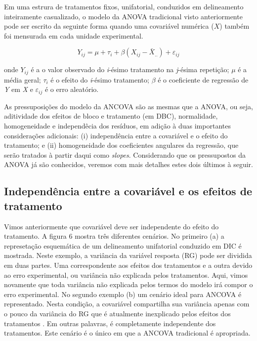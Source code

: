 \documentclass[
]{book}
\numberwithin{equation}{section}
\newcommand{\indt}[1]{\index{#1|ST}}
\begin{document}
Em uma estrura de tratamentos fixos, unifatorial, conduzidos em delineamento inteiramente casualizado, o modelo da ANOVA\indt{ANOVA} tradicional visto anteriormente pode ser escrito da seguinte forma quando uma covariável numérica (\(X\)) também foi mensurada em cada unidade experimental.

\[
Y_{ij} = \mu + \tau_i + \beta(X_{ij} - \bar X_{..}) + \varepsilon_{ij}
\]

onde \(Y_{ij}\) é a o valor observado do \emph{i}-ésimo tratamento na \emph{j}-ésima repetição; \(\mu\) é a média geral; \(\tau_i\) é o efeito do \emph{i}-ésimo tratamento; \(\beta\) é o coeficiente de regressão de \emph{Y} em \emph{X} e \(\varepsilon_{ij}\) é o erro aleatório.

As pressuposições do modelo da ANCOVA\indt{ANCOVA} são as mesmas que a ANOVA, ou seja, aditividade dos efeitos de bloco e tratamento (em DBC), normalidade, homogeneidade e independêcia dos resíduos, em adição à duas importantes considerações adicionais: (i) independência entre a covariável e o efeito do tratamento; e (ii) homogeneidade dos coeficientes angulares da regressão, que serão tratados à partir daqui como \emph{slopes}. Considerando que os pressupostos da ANOVA\indt{ANOVA} já são conhecidos, veremos com mais detalhes estes dois últimos à seguir.

\hypertarget{independuxeancia-entre-a-covariuxe1vel-e-os-efeitos-de-tratamento}{%
\subsection{Independência entre a covariável e os efeitos de tratamento}\label{independuxeancia-entre-a-covariuxe1vel-e-os-efeitos-de-tratamento}}

Vimos anteriormente que covariável deve ser independente do efeito do tratamento. A figura 6 mostra três diferentes cenários. No primeiro (a) a represetação esquemática de um delineamento unifatorial conduzido em DIC é mostrada. Neste exemplo, a variância da variável resposta (RG) pode ser dividida em duas partes. Uma correspondente aos efeitos dos tratamentos e a outra devido ao erro experimental, ou variância não explicada pelos tratamentos. Aqui, vimos novamente que toda variância não explicada pelos termos do modelo irá compor o erro experimental. No segundo exemplo (b) um cenário ideal para ANCOVA\indt{ANCOVA} é representado. Nesta condição, a covariável compartilha sua variância apenas com o pouco da variância do RG que é atualmente inexplicado pelos efeitos dos tratamentos . Em outras palavras, é completamente independente dos tratamentos. Este cenário é o único em que a ANCOVA\indt{ANCOVA} tradicional é apropriada.
\end{document}
